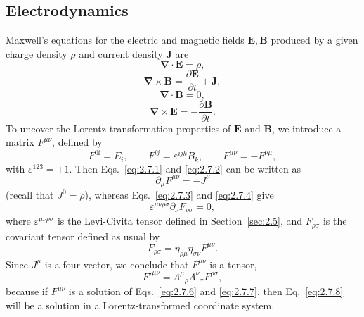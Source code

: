 
\subsection{Electrodynamics}\label{sec:2.7}

Maxwell's equations for the electric and magnetic fields \(\mathbf E,\mathbf B\)
produced by a given charge density \(\rho\) and current density \(\mathbf J\)
are
\begin{equation}
  \boldsymbol{\nabla}\cdot\mathbf E=\rho ,
  \tag{2.7.1}\label{eq:2.7.1}
\end{equation}
\begin{equation}
  \boldsymbol{\nabla}\times\mathbf B
  =\frac{\partial\mathbf E}{\partial t}+\mathbf J ,
  \tag{2.7.2}\label{eq:2.7.2}
\end{equation}
\begin{equation}
  \boldsymbol{\nabla}\cdot\mathbf B=0 ,
  \tag{2.7.3}\label{eq:2.7.3}
\end{equation}
\begin{equation}
  \boldsymbol{\nabla}\times\mathbf E
  =-\frac{\partial\mathbf B}{\partial t}.
  \tag{2.7.4}\label{eq:2.7.4}
\end{equation}
To uncover the Lorentz transformation properties of \(\mathbf E\) and
\(\mathbf B\), we introduce a matrix \(F^{\mu\nu}\), defined by
\begin{equation}
  F^{0\ii}=E_i,\qquad
  F^{ij}=\varepsilon^{ijk}B_k,\qquad
  F^{\mu\nu}=-F^{\nu\mu},
  \tag{2.7.5}\label{eq:2.7.5}
\end{equation}
with \(\varepsilon^{123}=+1\). Then Eqs.~\eqref{eq:2.7.1} and
\eqref{eq:2.7.2} can be written as
\begin{equation}
  \partial_\mu F^{\mu\nu}=-J^\nu
  \tag{2.7.6}\label{eq:2.7.6}
\end{equation}
(recall that \(J^0=\rho\)), whereas Eqs.~\eqref{eq:2.7.3} and
\eqref{eq:2.7.4} give
\begin{equation}
  \varepsilon^{\mu\nu\rho\sigma}\partial_\nu F_{\rho\sigma}=0 ,
  \tag{2.7.7}\label{eq:2.7.7}
\end{equation}
where \(\varepsilon^{\mu\nu\rho\sigma}\) is the Levi-Civita tensor defined in
Section~\ref{sec:2.5}, and \(F_{\rho\sigma}\) is the covariant tensor defined
as usual by
\[
  F_{\rho\sigma}
  =\eta_{\rho\mu}\eta_{\sigma\nu}F^{\mu\nu}.
\]
Since \(J^\mu\) is a four-vector, we conclude that \(F^{\mu\nu}\) is a tensor,
\begin{equation}
  F'^{\mu\nu}
  =\Lambda^\mu{}_\rho\Lambda^\nu{}_\sigma F^{\rho\sigma},
  \tag{2.7.8}\label{eq:2.7.8}
\end{equation}
because if \(F^{\mu\nu}\) is a solution of Eqs.~\eqref{eq:2.7.6} and
\eqref{eq:2.7.7}, then Eq.~\eqref{eq:2.7.8} will be a solution in a
Lorentz-transformed coordinate system.

